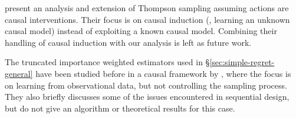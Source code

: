 
 \citet{Ortega2014thompson} present an analysis and extension of Thompson sampling assuming actions are causal interventions. Their focus is on causal induction (\ie, learning an unknown causal model) instead of exploiting a known causal model. Combining their handling of  causal induction with our analysis is left as future work.

The truncated importance weighted estimators used in \S\ref{sec:simple-regret-general} have been studied before in a causal framework by \citet{BJQ13}, 
where the focus is on learning from observational data, but not controlling the sampling process. They also briefly discusses some of the issues 
encountered in sequential design, but do not give an algorithm or theoretical results for this case.




